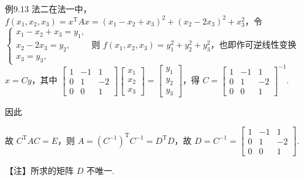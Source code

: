 \begin{fcard}{例9.13}
法二\quad 在法一中，$f(x_1,x_2,x_3)=x^{\mathrm{T}}Ax=(x_1-x_2+x_3)^2+(x_2-2x_3)^2+x_3^2$，令 $\begin{cases}x_1-x_2+x_3=y_1,\\x_2-2x_3=y_2,\\x_3=y_3,\end{cases}$ 则
$f(x_1,x_2,x_3)=y_1^2+y_2^2+y_3^2$，也即作可逆线性变换 $x=Cy$，其中 $\begin{bmatrix}1&-1&1\\0&1&-2\\0&0&1\end{bmatrix}\begin{bmatrix}x_1\\x_2\\x_3\end{bmatrix}=\begin{bmatrix}y_1\\y_2\\y_3\end{bmatrix}$，得 $C=\begin{bmatrix}1&-1&1\\0&1&-2\\0&0&1\end{bmatrix}^{-1}$.

因此

故 $C^{\mathrm{T}}AC=E$，则 $A=(C^{-1})^{\mathrm{T}}C^{-1}=D^{\mathrm{T}}D$，故 $D=C^{-1}=\begin{bmatrix}1&-1&1\\0&1&-2\\0&0&1\end{bmatrix}$.
\end{fcard}

\begin{fnote}
【注】所求的矩阵 $D$ 不唯一.
\end{fnote}

